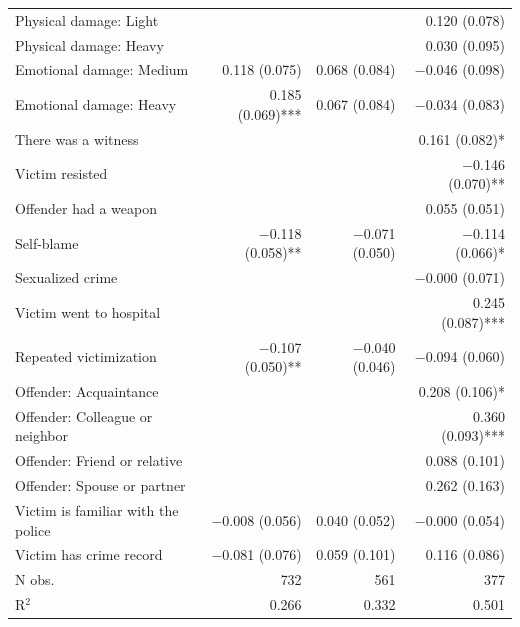 \begin{tabular}{lrrr}
Physical damage: Light &  &  & \num{0.120} (\num{0.078}) \\
Physical damage: Heavy &  &  & \num{0.030} (\num{0.095}) \\
Emotional damage: Medium & \num{0.118} (\num{0.075}) & \num{0.068} (\num{0.084}) & \num{-0.046} (\num{0.098}) \\
Emotional damage:  Heavy & \num{0.185} (\num{0.069})*** & \num{0.067} (\num{0.084}) & \num{-0.034} (\num{0.083}) \\
There was a witness &  &  & \num{0.161} (\num{0.082})* \\
Victim resisted &  &  & \num{-0.146} (\num{0.070})** \\
Offender had a weapon &  &  & \num{0.055} (\num{0.051}) \\
Self-blame & \num{-0.118} (\num{0.058})** & \num{-0.071} (\num{0.050}) & \num{-0.114} (\num{0.066})* \\
Sexualized crime &  &  & \num{-0.000} (\num{0.071}) \\
Victim went to hospital &  &  & \num{0.245} (\num{0.087})*** \\
Repeated victimization & \num{-0.107} (\num{0.050})** & \num{-0.040} (\num{0.046}) & \num{-0.094} (\num{0.060}) \\
Offender:          Acquaintance &  &  & \num{0.208} (\num{0.106})* \\
Offender: Colleague or neighbor &  &  & \num{0.360} (\num{0.093})*** \\
Offender:    Friend or relative &  &  & \num{0.088} (\num{0.101}) \\
Offender:     Spouse or partner &  &  & \num{0.262} (\num{0.163}) \\
Victim is familiar with the police & \num{-0.008} (\num{0.056}) & \num{0.040} (\num{0.052}) & \num{-0.000} (\num{0.054}) \\
Victim has crime record & \num{-0.081} (\num{0.076}) & \num{0.059} (\num{0.101}) & \num{0.116} (\num{0.086}) \\
\midrule
N obs. & \num{732} & \num{561} & \num{377} \\
R$^2$ & \num{0.266} & \num{0.332} & \num{0.501} \\
\midrule
\end{tabular}
	\endgroup